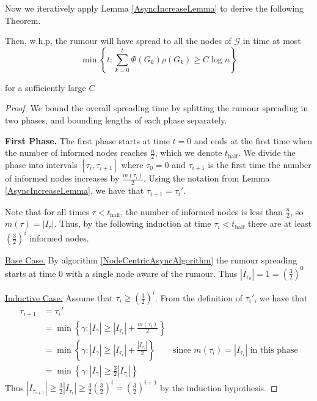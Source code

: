 Now we iteratively apply Lemma \ref{AsyncIncreaseLemma} to derive the following Theorem.

\begin{theorem}\label{theorem:AsyncUpperBound}
	\ModelIntro Then, w.h.p, the rumour will have spread to all the nodes of $\mathcal{G}$ in time at most
	$$
		\min \left\{t : \sum_{k=0}^t \Phi(G_k)\rho(G_k) \geq C \log n \right\} 
	$$
	
	\noindent
	for a sufficiently large $C$
\end{theorem}

\begin{proof}
	We bound the overall spreading time by splitting the rumour spreading in two phases, and bounding lengths of each phase separately.


	\textbf{First Phase.} The first phase starts at time $t=0$ and ends at the first time when the number of informed nodes reaches $\frac{n}{2}$, which we denote $t_\text{half}$. We divide the phase into intervals $[\tau_i, \tau_{i+1}]$ where $\tau_0 = 0$ and $\tau_{i+1}$ is the first time the number of informed nodes increases by $\frac{m(\tau_i)}{2}$. 
	Using the notation from Lemma \ref{AsyncIncreaseLemma}, we have that $\tau_{i+1} = \tau_i'$. 
	
	Note that for all times $\tau < t_\text{half}$, the number of informed nodes is less than $\frac{n}{2}$, so $m(\tau) = |I_\tau|$. Thus, by the following induction at time $\tau_i < t_\text{half}$ there are at least $(\frac{3}{2})^i$ informed nodes.

	\underline{Base Case.}
	By algorithm \ref{NodeCentricAsyncAlgorithm} the rumour spreading starts at time 0 with a single node aware of the rumour. Thus $|I_{\tau_0}| = 1 = (\frac{3}{2})^0$

	\underline{Inductive Case.} 
	Assume that $\tau_i \geq (\frac{3}{2})^i$.
	From the definition of $\tau_i'$, we have that 
	\begin{align*}
		\tau_{i+1} &= \tau_i' \\
		&= \min\left\{\gamma : |I_{\gamma}| \geq |I_{\tau_i}| + \frac{m(\tau_i)}{2}\right\} \\
		&= \min\left\{\gamma : |I_{\gamma}| \geq |I_{\tau_i}| + \frac{|I_{\tau_i}|}{2}\right\} & \text{since } m(\tau_i) = |I_{\tau _i}| \text{ in this phase} \\ 
		&= \min\left\{\gamma : |I_{\gamma}| \geq \frac{3}{2}|I_{\tau_i}|\right\} 
	\end{align*}
	Thus $|I_{\tau_{i+1}}| \geq \frac{3}{2}|I_{\tau_i}| \geq \frac{3}{2}(\frac{3}{2})^i = (\frac{3}{2})^{i+1}$ by the induction hypothesis. 
	

\end{proof}
